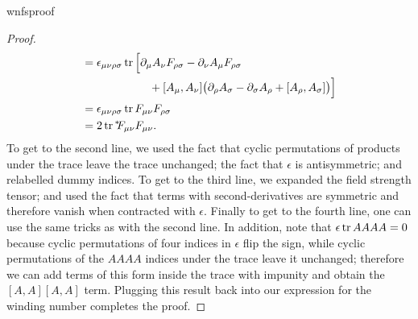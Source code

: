 \begin{proposition}{}{wnfsproof}
\begin{proof}
\begin{equation*}
\begin{aligned}
       &=\epsilon_{\mu\nu\rho\sigma}\tr\Big[\partial_\mu A_\nu F_{\rho\sigma}
           -\partial_\nu A_\mu F_{\rho\sigma}\\
           &~~~~~~~~~~~~~~~~~~+[A_\mu,A_\nu]
                    \big(\partial_\rho A_\sigma-\partial_\sigma A_\rho
                          +[A_\rho,A_\sigma]\big)\Big]\\
       &=\epsilon_{\mu\nu\rho\sigma}\tr F_{\mu\nu}F_{\rho\sigma}\\
       &=2\tr \dual{F_{\mu\nu}}F_{\mu\nu}.
    \end{aligned}
    \end{equation*}
    To get to the second line, we used the fact that cyclic permutations
    of products under the trace leave the trace unchanged; the fact that
    $\epsilon$ is antisymmetric; and relabelled dummy indices. To get to
    the third line, we expanded the field strength tensor; and used the fact
    that terms with second-derivatives are symmetric and therefore vanish
    when contracted with $\epsilon$. Finally to get to the fourth line,
    one can use the same tricks as with the second line. In addition,
    note that $\epsilon\tr AAAA=0$ because cyclic permutations of
    four indices in $\epsilon$ flip the sign, while cyclic permutations
    of the $AAAA$ indices under the trace leave it unchanged; therefore
    we can add terms of this form inside the trace with impunity
    and obtain the $[A,A][A,A]$ term.
    Plugging this result back into our expression for the winding number
    completes the proof.
  \end{proof}
\end{proposition}

